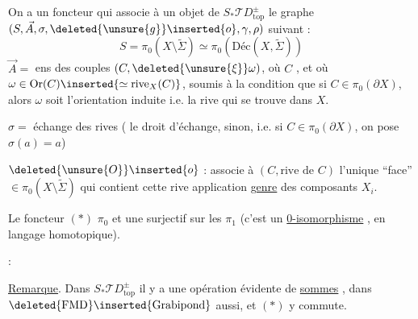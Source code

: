 On a un foncteur
qui associe à un objet  de
$S_*\mathcal TD^\pm_{\mathrm{top}}$ le graphe 
$(S,\vec A,\sigma,\deleted{\unsure{g}}\inserted{o},\gamma,\rho)$ suivant :
\[
S=\pi_0(X\setminus\widetilde\Sigma)\simeq\pi_0(\text{Déc}(X,\widetilde\Sigma))
\]
$\vec A=$ ens des couples $(C,\deleted{\unsure{\xi}}\omega)$, où
$C$ , et où
$\omega\in\mathrm{Or}(C)\inserted{\simeq\mathrm{rive}_X(C)}$,
soumis à la condition que si $C\in\pi_0(\partial X)$, alors $\omega$
soit l'orientation induite i.e. la rive qui se trouve dans $X$.

$\sigma=$ échange des rives ( le droit d'échange,
sinon, i.e. si $C\in\pi_0(\partial X)$, on pose $\sigma(a)=a$)

$\deleted{\unsure{O}}\inserted{o}$ : associe à $(C,\text{rive de }C)$
l'unique ``face'' $\in\pi_0(X\setminus\widetilde\Sigma)$ qui
contient cette rive 
application \uline{genre} des composants $X_i$.

Le foncteur $(*)$ 
 $\pi_0$ et une surjectif
sur les $\pi_1$ (c'est un \uline{0-isomorphisme} ,
en langage homotopique).

 :

\uline{Remarque}. Dans $S_*\mathcal TD^\pm_{\mathrm{top}}$ il y a une
opération évidente de \uline{sommes} ,
dans $\deleted{\mathrm{FMD}}\inserted{\mathrm{Grabipond}}$ aussi,
et $(*)$ y commute.
